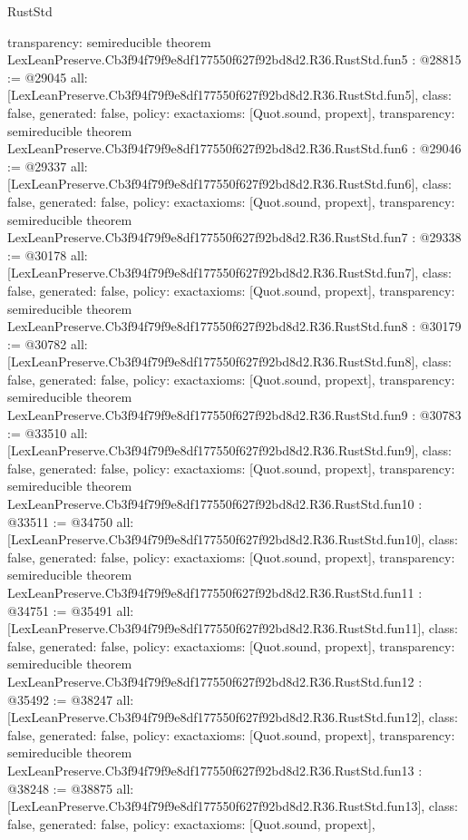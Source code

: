 \begin{lexlean}{RustStd}
\begin{coremodule}
{  transparency: semireducible
}
theorem LexLeanPreserve.Cb3f94f79f9e8df177550f627f92bd8d2.R36.RustStd.fun5 : @28815 := @29045 {
  all: [LexLeanPreserve.Cb3f94f79f9e8df177550f627f92bd8d2.R36.RustStd.fun5],
  class: false,
  generated: false,
  policy: exact{axioms: [Quot.sound, propext]},
  transparency: semireducible
}
theorem LexLeanPreserve.Cb3f94f79f9e8df177550f627f92bd8d2.R36.RustStd.fun6 : @29046 := @29337 {
  all: [LexLeanPreserve.Cb3f94f79f9e8df177550f627f92bd8d2.R36.RustStd.fun6],
  class: false,
  generated: false,
  policy: exact{axioms: [Quot.sound, propext]},
  transparency: semireducible
}
theorem LexLeanPreserve.Cb3f94f79f9e8df177550f627f92bd8d2.R36.RustStd.fun7 : @29338 := @30178 {
  all: [LexLeanPreserve.Cb3f94f79f9e8df177550f627f92bd8d2.R36.RustStd.fun7],
  class: false,
  generated: false,
  policy: exact{axioms: [Quot.sound, propext]},
  transparency: semireducible
}
theorem LexLeanPreserve.Cb3f94f79f9e8df177550f627f92bd8d2.R36.RustStd.fun8 : @30179 := @30782 {
  all: [LexLeanPreserve.Cb3f94f79f9e8df177550f627f92bd8d2.R36.RustStd.fun8],
  class: false,
  generated: false,
  policy: exact{axioms: [Quot.sound, propext]},
  transparency: semireducible
}
theorem LexLeanPreserve.Cb3f94f79f9e8df177550f627f92bd8d2.R36.RustStd.fun9 : @30783 := @33510 {
  all: [LexLeanPreserve.Cb3f94f79f9e8df177550f627f92bd8d2.R36.RustStd.fun9],
  class: false,
  generated: false,
  policy: exact{axioms: [Quot.sound, propext]},
  transparency: semireducible
}
theorem LexLeanPreserve.Cb3f94f79f9e8df177550f627f92bd8d2.R36.RustStd.fun10 : @33511 := @34750 {
  all: [LexLeanPreserve.Cb3f94f79f9e8df177550f627f92bd8d2.R36.RustStd.fun10],
  class: false,
  generated: false,
  policy: exact{axioms: [Quot.sound, propext]},
  transparency: semireducible
}
theorem LexLeanPreserve.Cb3f94f79f9e8df177550f627f92bd8d2.R36.RustStd.fun11 : @34751 := @35491 {
  all: [LexLeanPreserve.Cb3f94f79f9e8df177550f627f92bd8d2.R36.RustStd.fun11],
  class: false,
  generated: false,
  policy: exact{axioms: [Quot.sound, propext]},
  transparency: semireducible
}
theorem LexLeanPreserve.Cb3f94f79f9e8df177550f627f92bd8d2.R36.RustStd.fun12 : @35492 := @38247 {
  all: [LexLeanPreserve.Cb3f94f79f9e8df177550f627f92bd8d2.R36.RustStd.fun12],
  class: false,
  generated: false,
  policy: exact{axioms: [Quot.sound, propext]},
  transparency: semireducible
}
theorem LexLeanPreserve.Cb3f94f79f9e8df177550f627f92bd8d2.R36.RustStd.fun13 : @38248 := @38875 {
  all: [LexLeanPreserve.Cb3f94f79f9e8df177550f627f92bd8d2.R36.RustStd.fun13],
  class: false,
  generated: false,
  policy: exact{axioms: [Quot.sound, propext]},
}
\end{coremodule}
\end{lexlean}
